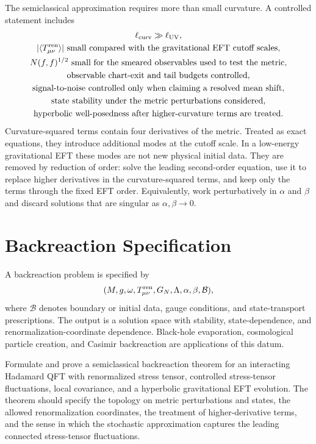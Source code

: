 The semiclassical approximation requires more than small curvature.  A
controlled statement includes
\begin{equation}
\begin{gathered}
  \ell_{\rm curv}\gg \ell_{\rm UV},\\
  |\langle T_{\mu\nu}^{\rm ren}\rangle|
  \text{ small compared with the gravitational EFT cutoff scales},\\
  N(f,f)^{1/2}
  \text{ small for the smeared observables used to test the metric},\\
  \text{observable chart-exit and tail budgets controlled},\\
  \text{signal-to-noise controlled only when claiming a resolved mean shift},\\
  \text{state stability under the metric perturbations considered},\\
  \text{hyperbolic well-posedness after higher-curvature terms are treated}.
\end{gathered}
  \label{eq:semiclassical-validity-conditions}
\end{equation}
Curvature-squared terms contain four derivatives of the metric.  Treated as
exact equations, they introduce additional modes at the cutoff scale.  In a
low-energy gravitational EFT these modes are not new physical initial data.
They are removed by reduction of order: solve the leading second-order
equation, use it to replace higher derivatives in the curvature-squared
terms, and keep only the terms through the fixed EFT order.  Equivalently,
work perturbatively in \(\alpha\) and \(\beta\) and discard solutions that
are singular as \(\alpha,\beta\to0\).

\section{Backreaction Specification}

A backreaction problem is specified by
\[
  (M,g,\omega,T_{\mu\nu}^{\rm ren},
  G_N,\Lambda,\alpha,\beta,\mathcal B),
\]
where \(\mathcal B\) denotes boundary or initial data, gauge conditions, and
state-transport prescriptions.  The output is a solution space with
stability, state-dependence, and renormalization-coordinate dependence.
Black-hole evaporation, cosmological particle creation, and Casimir
backreaction are applications of this datum.

\begin{openproblem}
\label{op:backreaction-theorem}
Formulate and prove a semiclassical backreaction theorem for an interacting
Hadamard QFT with renormalized stress tensor, controlled stress-tensor
fluctuations, local covariance, and a hyperbolic gravitational EFT evolution.
The theorem should specify the topology on metric perturbations and states,
the allowed renormalization coordinates, the treatment of higher-derivative
terms, and the sense in which the stochastic approximation captures the
leading connected stress-tensor fluctuations.
\end{openproblem}
